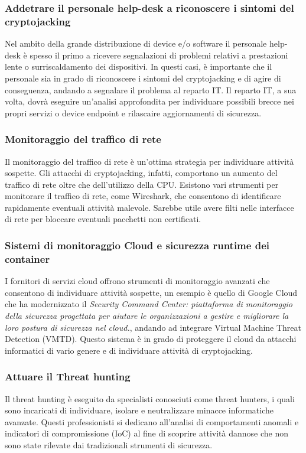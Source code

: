 \documentclass[12pt,a4paper]{article}
\begin{document}
\subsubsection{Addetrare il personale help-desk a riconoscere i sintomi del cryptojacking}
Nel ambito della grande distribuzione di device e/o software il personale
help-desk è spesso il primo a ricevere segnalazioni di problemi relativi a
prestazioni lente o surriscaldamento dei dispositivi. In questi casi, è
importante che il personale sia in grado di riconoscere i sintomi del
cryptojacking e di agire di conseguenza, andando a segnalare il problema al
reparto IT. Il reparto IT, a sua volta, dovrà eseguire un'analisi approfondita
per individuare possibili brecce nei propri servizi o device endpoint e
rilascaire aggiornamenti di sicurezza.

\subsubsection{Monitoraggio del traffico di rete}
Il monitoraggio del traffico di rete è un'ottima strategia per individuare
attività sospette. Gli attacchi di cryptojacking, infatti, comportano un aumento
del traffico di rete oltre che dell'utilizzo della CPU. Esistono vari strumenti
per monitorare il traffico di rete, come Wireshark, che consentono di
identificare rapidamente eventuali attività malevole. Sarebbe utile avere filti
nelle interfacce di rete per bloccare eventuali pacchetti non certificati. 

\subsubsection{Sistemi di monitoraggio Cloud e sicurezza runtime dei container}
I fornitori di servizi cloud offrono strumenti di monitoraggio avanzati che
consentono di individuare attività sospette, un esempio è quello di Google Cloud
che ha modernizzato il \textit{Security Command Center: piattaforma di
monitoraggio della sicurezza progettata per aiutare le organizzazioni a gestire
e migliorare la loro postura di sicurezza nel cloud.}, andando ad integrare
Virtual Machine Threat Detection (VMTD). Questo sistema è in grado di proteggere
il cloud da attacchi informatici di vario genere e di individuare attività di
cryptojacking.

\subsubsection{Attuare il Threat hunting}
Il threat hunting è eseguito da specialisti conosciuti come threat hunters, i
quali sono incaricati di individuare, isolare e neutralizzare minacce
informatiche avanzate. Questi professionisti si dedicano all'analisi di
comportamenti anomali e indicatori di compromissione (IoC) al fine di scoprire
attività dannose che non sono state rilevate dai tradizionali strumenti di
sicurezza.
\end{document}
